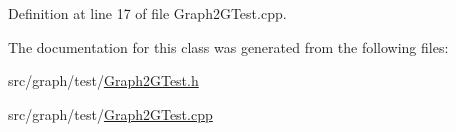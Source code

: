 Definition at line 17 of file Graph2\-G\-Test.\-cpp.



The documentation for this class was generated from the following files\-:\begin{DoxyCompactItemize}
\item 
src/graph/test/\hyperlink{_graph2_g_test_8h}{Graph2\-G\-Test.\-h}\item 
src/graph/test/\hyperlink{_graph2_g_test_8cpp}{Graph2\-G\-Test.\-cpp}\end{DoxyCompactItemize}
